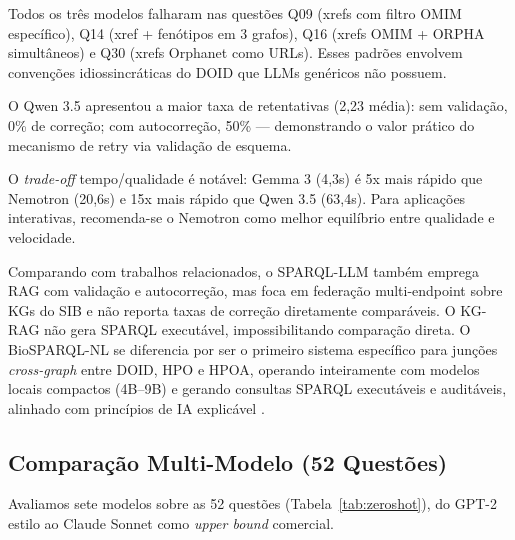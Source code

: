 \documentclass[12pt]{article}
\begin{document}
Todos os tr\^{e}s modelos falharam nas quest\~{o}es Q09 (xrefs com filtro OMIM espec\'{i}fico), Q14 (xref + fen\'{o}tipos em 3 grafos), Q16 (xrefs OMIM + ORPHA simult\^{a}neos) e Q30 (xrefs Orphanet como URLs). Esses padr\~{o}es envolvem conven\c{c}\~{o}es idiossincr\'{a}ticas do DOID que LLMs gen\'{e}ricos n\~{a}o possuem.

O Qwen 3.5 apresentou a maior taxa de retentativas (2,23 m\'{e}dia): sem valida\c{c}\~{a}o, 0\% de corre\c{c}\~{a}o; com autocorre\c{c}\~{a}o, 50\% --- demonstrando o valor pr\'{a}tico do mecanismo de retry via valida\c{c}\~{a}o de esquema.

O \textit{trade-off} tempo/qualidade \'{e} not\'{a}vel: Gemma 3 (4,3s) \'{e} 5x mais r\'{a}pido que Nemotron (20,6s) e 15x mais r\'{a}pido que Qwen 3.5 (63,4s). Para aplica\c{c}\~{o}es interativas, recomenda-se o Nemotron como melhor equil\'{i}brio entre qualidade e velocidade.

Comparando com trabalhos relacionados, o SPARQL-LLM \cite{emonet2024sparqlllm} tamb\'{e}m emprega RAG com valida\c{c}\~{a}o e autocorre\c{c}\~{a}o, mas foca em federa\c{c}\~{a}o multi-endpoint sobre KGs do SIB e n\~{a}o reporta taxas de corre\c{c}\~{a}o diretamente compar\'{a}veis. O KG-RAG \cite{soman2024kgrag} n\~{a}o gera SPARQL execut\'{a}vel, impossibilitando compara\c{c}\~{a}o direta. O BioSPARQL-NL se diferencia por ser o primeiro sistema espec\'{i}fico para jun\c{c}\~{o}es \textit{cross-graph} entre DOID, HPO e HPOA, operando inteiramente com modelos locais compactos (4B--9B) e gerando consultas SPARQL execut\'{a}veis e audit\'{a}veis, alinhado com princ\'{i}pios de IA explic\'{a}vel \cite{prenosil2025neurosymbolic}.

\subsection{Compara\c{c}\~{a}o Multi-Modelo (52 Quest\~{o}es)}
\label{sec:zeroshot}

Avaliamos sete modelos sobre as 52 quest\~{o}es (Tabela~\ref{tab:zeroshot}), do GPT-2 estilo ao Claude Sonnet como \textit{upper bound} comercial.
\end{document}
